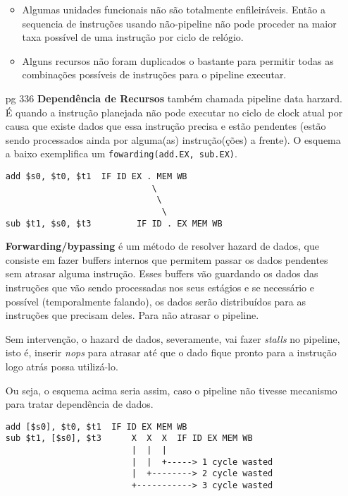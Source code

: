 \documentclass{article}
\begin{document}
\begin{enumerate}
\begin{itemize}
\end{itemize}

\begin{itemize}
\item Algumas unidades funcionais não são totalmente enfileiráveis. Então a 
sequencia de instruções usando não-pipeline não pode proceder na maior taxa 
possível de uma instrução por ciclo de relógio.
\item Alguns recursos não foram duplicados o bastante para permitir todas as 
combinações possíveis de instruções para o pipeline executar.
\end{itemize}

\item[pg 336] \textbf{Dependência de Recursos} também chamada pipeline data
harzard. É quando a instrução planejada não pode executar no ciclo de clock
atual por causa que existe dados que essa instrução precisa e estão pendentes
(estão sendo processados ainda por alguma(as) instrução(ções) a frente). O
esquema a baixo exemplifica um \verb|fowarding(add.EX, sub.EX)|.

\begin{verbatim}
add $s0, $t0, $t1  IF ID EX . MEM WB
                             \
                              \
                               \
sub $t1, $s0, $t3         IF ID . EX MEM WB
\end{verbatim}

\textbf{Forwarding/bypassing} é um método de resolver hazard de dados, que 
consiste em fazer buffers internos que permitem passar os dados pendentes sem 
atrasar alguma instrução. Esses buffers vão guardando os dados das instruções 
que vão sendo processadas nos seus estágios e se necessário e possível 
(temporalmente falando), os dados serão distribuídos para as instruções que 
precisam deles. Para não atrasar o pipeline.

Sem intervenção, o hazard de dados, severamente, vai fazer \textit{stalls} no 
pipeline, isto é, inserir \textit{nops} para atrasar até que o dado fique 
pronto para a instrução logo atrás possa utilizá-lo.

Ou seja, o esquema acima seria assim, caso o pipeline não tivesse mecanismo 
para tratar dependência de dados.

\begin{verbatim}
add [$s0], $t0, $t1  IF ID EX MEM WB
sub $t1, [$s0], $t3      X  X  X  IF ID EX MEM WB
                         |  |  |
                         |  |  +-----> 1 cycle wasted
                         |  +--------> 2 cycle wasted
                         +-----------> 3 cycle wasted
\end{verbatim}


\end{enumerate}
\end{document}
